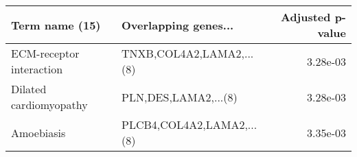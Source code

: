 \begin{tabular}{llr}
\toprule
          Term name (15) &      Overlapping genes... &  Adjusted p-value \\
\midrule
ECM-receptor interaction &  TNXB,COL4A2,LAMA2,...(8) &          3.28e-03 \\
  Dilated cardiomyopathy &      PLN,DES,LAMA2,...(8) &          3.28e-03 \\
              Amoebiasis & PLCB4,COL4A2,LAMA2,...(8) &          3.35e-03 \\
\bottomrule
\end{tabular}
